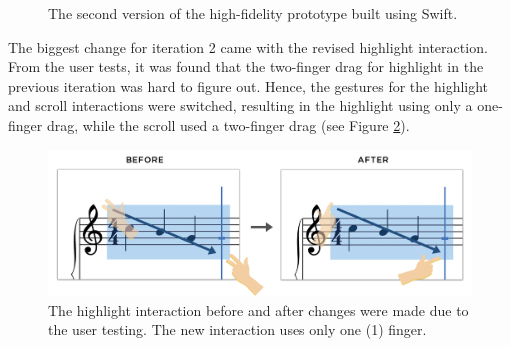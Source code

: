 				\begin{figure}[H]
					\centering
				    \caption{The second version of the high-fidelity prototype built using Swift.}
				    \label{fig:flow_it2}
				\end{figure} 

				The biggest change for iteration 2 came with the revised highlight interaction. From the user tests, it was found that the two-finger drag for highlight in the previous iteration was hard to figure out. Hence, the gestures for the highlight and scroll interactions were switched, resulting in the highlight using only a one-finger drag, while the scroll used a two-finger drag (see Figure \ref{fig:highlight}). 

				\begin{figure}[h]
					\centering
					\includegraphics[scale=0.25]{figures/before-after-highlight.png}
				    \caption{The highlight interaction before and after changes were made due to the user testing. The new interaction uses only one (1) finger.}
				    \label{fig:highlight}
				\end{figure}

